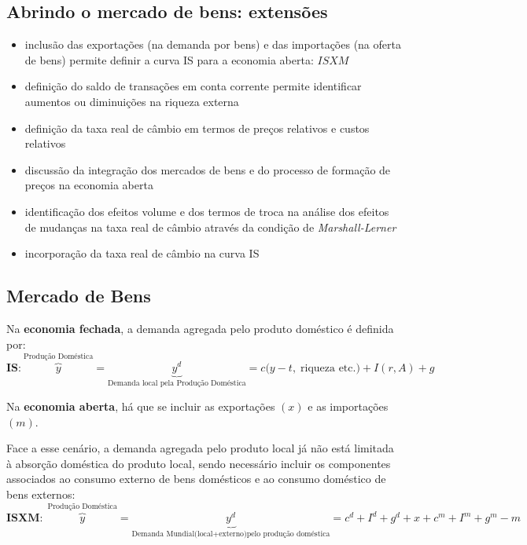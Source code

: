 \documentclass[a4paper,12pt]{article}[abntex2]
\begin{document}
\subsection{\textbf{Abrindo o mercado de bens: extensões}}
\begin{itemize}
    \item inclusão das exportações (na demanda por bens) e das importações (na oferta de bens) permite definir a curva IS para a economia aberta: $ISXM$
    
    \item definição do saldo de transações em conta corrente permite identificar aumentos ou diminuições na riqueza externa
    
    \item definição da taxa real de câmbio em termos de preços relativos e custos relativos
    
    \item discussão da integração dos mercados de bens e do processo de formação de preços na economia aberta
    
    \item identificação dos efeitos volume e dos termos de troca na análise dos efeitos de mudanças na taxa real de câmbio através da condição de \textit{Marshall-Lerner}
    
    \item incorporação da taxa real de câmbio na curva IS
\end{itemize}



\subsection{\textbf{Mercado de Bens}}
Na \textbf{economia fechada}, a demanda agregada pelo produto doméstico é definida por:
\[
\textbf{IS:} \  \overbrace{y}^{\text{Produção Doméstica}}=\underbrace{y^{d}}_{\text{Demanda local pela Produção Doméstica}}=c\bigl(y-t,\;\text{riqueza etc.}\bigr)+I(r,A)+g
\]

Na \textbf{economia aberta}, há que se incluir as exportações $(x)$ e as importações $(m)$.

Face a esse cenário, a demanda agregada pelo produto local já não está limitada à absorção doméstica do produto local, sendo necessário incluir os componentes associados ao consumo externo de bens domésticos e ao consumo doméstico de bens externos:
\[
\textbf{ISXM:} \ \ \overbrace{y}^{\text{Produção Doméstica}}=\underbrace{y^{d}}_{\text{Demanda Mundial(local+externo)pelo produção doméstica}}=c^{d}+I^{d}+g^{d}+x+c^{m}+I^{m}+g^{m}-m
\]
\end{document}
